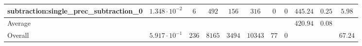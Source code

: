 \begin{tabular}{|l|c|c|c|c|c|c|c|c|c|c|}
subtraction:single\_prec\_subtraction\_0         & $ 1.348 \cdot 10^{-2} $ & $ 6      $ & $ 492  $ & $ 156  $ & $ 316   $ & $ 0  $ & $ 0 $ & $ 445.24      $ & $ 0.25    $ & $ 5.98    $ \\
\hline
Average                                          & $                     $ & $        $ & $      $ & $      $ & $       $ & $    $ & $   $ & $ 420.94      $ & $ 0.08    $ & $         $ \\
\hline
Overall                                          & $ 5.917 \cdot 10^{-1} $ & $ 236    $ & $ 8165 $ & $ 3494 $ & $ 10343 $ & $ 77 $ & $ 0 $ & $             $ & $         $ & $ 67.24   $ \\
\hline
\end{tabular}
